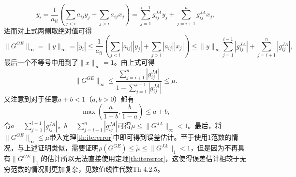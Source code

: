 \documentclass[a4paper,10pt]{ctexart}
\begin{document}
\[
    y_i = \frac{1}{a_{ii}} \left( \sum_{j<i} a_{ij}y_j + \sum_{j>i} a_{ij}x_j \right) = \sum_{j= 1}^{i-1} g^{JA}_{ij}y_j + \sum_{j=i+1}^n g^{JA}_{ij}x_j,
\]
进而对上式两侧取绝对值可得
\[
    \| G^{GE} \|_\infty = \| y \|_\infty = |y_i|\leqslant \frac{1}{a_{ii}} \left( \sum_{j<i} |a_{ij}||y_j| + \sum_{j>i} |a_{ij}||x_j| \right)  \leqslant \| y \|_\infty \sum_{j=1}^{i-1} |g^{JA}_{ij}| + \sum_{j=i+1}^n |g^{JA}_{ij}|,
\]
最后一个不等号中用到了$ \| x \|_\infty=1 $。由上式可得
\[
    \| G^{GE} \|_\infty \leqslant  \frac{\sum_{j=i+1}^{n}|g^{JA}_{ij}|}{1-\sum_{j=1}^{i-1}|g^{JA}_{ij}|} \leqslant \mu.
\]
又注意到对于任意$ a+b<1 $（$ a,b>0 $）都有
\[
    \max \left( \frac{a}{1-b}, \frac{b}{1-a} \right) \leqslant a+b,
\]
令$ a = \sum_{j=1}^{i-1}|g^{JA}_{ij}| $，$ b = \sum_{j=i+1}^{n}|g^{JA}_{ij}| $可得$ \mu \leqslant  \| G^{JA} \|_\infty <1 $。最后，将$ \| G^{GE} \|_\infty\leqslant \mu $带入定理\ref{th:itererror}中即可得到误差估计。至于使用1范数的情况，与上述证明类似，需要证明$ \rho(G^{GE})\leqslant \tilde{\mu}\leqslant \| G^{JA} \|_1<1 $，但是因为不再具有$ \| G^{GE} \|_1 $的估计所以无法直接使用定理\ref{th:itererror}，这使得误差估计相较于无穷范数的情况则更加复杂，见数值线性代数Th 4.2.5。
\end{document}
